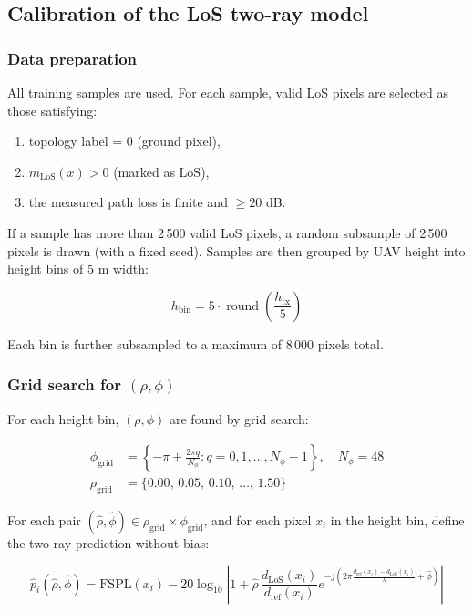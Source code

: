 \subsection{Calibration of the LoS two-ray model}
\label{sec:los_calibration}

\subsubsection{Data preparation}

All training samples are used. For each sample, valid LoS pixels are selected
as those satisfying:
\begin{enumerate}
\item topology label = 0 (ground pixel),
\item $m_{\mathrm{LoS}}(x) > 0$ (marked as LoS),
\item the measured path loss is finite and $\ge 20$ dB.
\end{enumerate}
If a sample has more than 2\,500 valid LoS pixels, a random subsample of
2\,500 pixels is drawn (with a fixed seed). Samples are then grouped by UAV
height into height bins of 5 m width:

\begin{equation}
h_{\mathrm{bin}} = 5 \cdot \operatorname{round}\!\left(\frac{h_{\mathrm{tx}}}{5}\right)
\end{equation}

Each bin is further subsampled to a maximum of 8\,000 pixels total.

\subsubsection{Grid search for $(\rho, \phi)$}

For each height bin, $(\rho, \phi)$ are found by grid search:

\begin{align}
\phi_{\mathrm{grid}} &= \left\{-\pi + \frac{2\pi q}{N_\phi} : q = 0, 1, \ldots, N_\phi - 1\right\},
\quad N_\phi = 48 \label{eq:phi_grid}\\
\rho_{\mathrm{grid}} &= \{0.00,\, 0.05,\, 0.10,\, \ldots,\, 1.50\}
\label{eq:rho_grid}
\end{align}

For each pair $(\hat\rho, \hat\phi) \in \rho_{\mathrm{grid}} \times
\phi_{\mathrm{grid}}$, and for each pixel $x_i$ in the height bin, define
the two-ray prediction without bias:

\begin{equation}
\hat p_i(\hat\rho, \hat\phi)
=
\mathrm{FSPL}(x_i)
- 20\log_{10}
\left|
1 + \hat\rho\,\frac{d_{\mathrm{LoS}}(x_i)}{d_{\mathrm{ref}}(x_i)}
e^{-j\left(2\pi\frac{d_{\mathrm{ref}}(x_i)-d_{\mathrm{LoS}}(x_i)}{\lambda}+\hat\phi\right)}
\right|
\end{equation}

